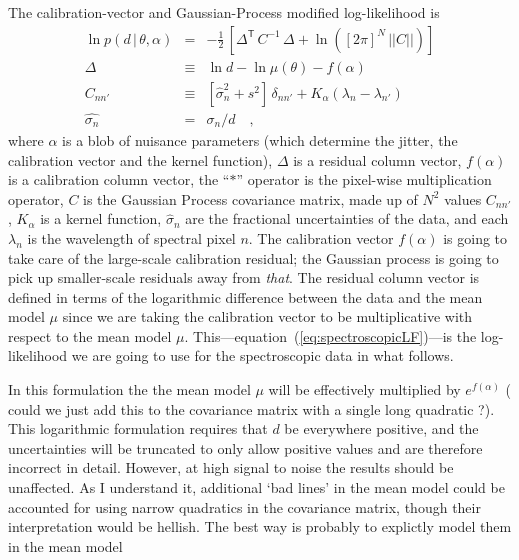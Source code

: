 \documentclass[iop,numberedappendix]{emulateapj}
\newcommand{\transpose}[1]{{#1}^{\!\mathsf T}}
\newcommand{\given}{\,|\,}
\renewcommand{\det}[1]{||{#1}||}
\begin{document}
The calibration-vector and Gaussian-Process modified log-likelihood is
\begin{eqnarray}\label{eq:spectroscopicLF}
\ln p(d\given\theta,\alpha) &=& -\frac{1}{2}\,\left[\transpose{\Delta}\,C^{-1}\,\Delta + \ln([2\pi]^N\,\det{C}) \right]
\\
\Delta &\equiv& \ln d - \ln \mu(\theta) - f(\alpha) 
\\
C_{nn'} &\equiv& [\hat{\sigma}_n^2 + s^2]\,\delta_{nn'} +
K_\alpha(\lambda_n - \lambda_{n'})
\\
\hat{\sigma_n} & = &\sigma_n/d
\quad ,
\end{eqnarray}
where $\alpha$ is a blob of nuisance parameters
(which determine the jitter, the calibration vector and the kernel function),
$\Delta$ is a residual column vector,
$f(\alpha)$ is a calibration column vector,
the ``$\ast$'' operator is the pixel-wise multiplication operator,
$C$ is the Gaussian Process covariance matrix,
made up of $N^2$ values $C_{nn'}$,
$K_\alpha$ is a kernel function,
$\hat{\sigma}_n$ are the fractional uncertainties of the data,
and each $\lambda_n$ is the wavelength of spectral pixel $n$.
The calibration vector $f(\alpha)$ is going to take care of the
large-scale calibration residual; the Gaussian process is going to
pick up smaller-scale residuals away from \emph{that}.
The residual column vector is defined in terms of the logarithmic
difference between the data and the mean model $\mu$ since we are
taking the calibration vector to be multiplicative with respect to
the mean model $\mu$.
This---equation~(\ref{eq:spectroscopicLF})---is the log-likelihood we
are going to use for the spectroscopic data in what follows.

In this formulation the the mean model $\mu$ will be effectively
multiplied by $e ^{f(\alpha)}$ ({\color{red} could we just add this to
the covariance matrix with a single long quadratic ?}).  This
logarithmic formulation requires that $d$ be everywhere positive, and
the uncertainties will be truncated to only allow positive values and
are therefore incorrect in detail.  However, at high signal to noise
the results should be unaffected. {\color{red} As I understand it,
additional `bad lines' in the mean model could be accounted for using
narrow quadratics in the covariance matrix, though their
interpretation would be hellish. The best way is probably to explictly
model them in the mean model}
\end{document}
